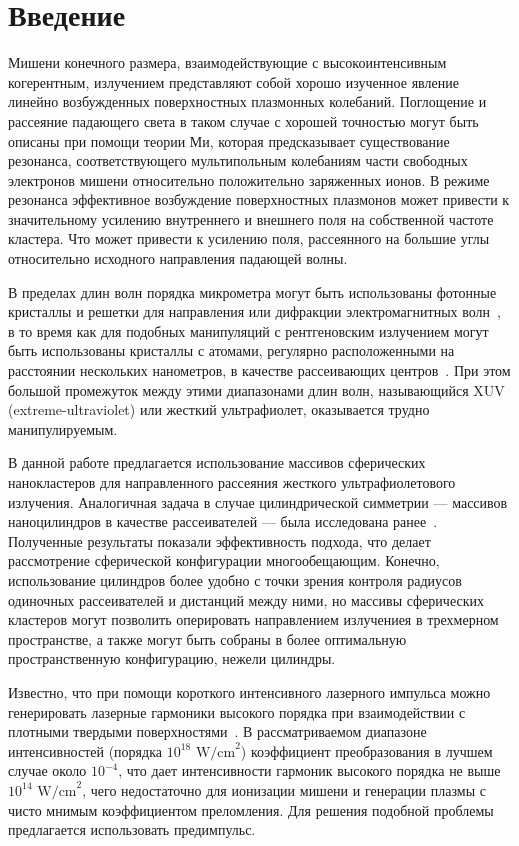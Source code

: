 \section{Введение}

Мишени конечного размера, взаимодействующие с высокоинтенсивным когерентным, излучением представляют собой хорошо изученное явление линейно возбужденных 
поверхностных плазмонных колебаний. Поглощение и рассеяние падающего света в таком случае с хорошей точностью могут быть описаны при помощи теории Ми, которая предсказывает существование резонанса, соответствующего мультипольным колебаниям части свободных электронов мишени относительно положительно заряженных ионов. В режиме резонанса эффективное возбуждение поверхностных плазмонов может привести к значительному усилению внутреннего и внешнего поля на собственной частоте кластера. Что может привести к усилению поля, рассеянного на большие углы относительно исходного направления падающей волны.

В пределах длин волн порядка микрометра могут быть использованы фотонные кристаллы и решетки для направления или дифракции электромагнитных волн~\cite{lin_zhang}, в то время как для подобных манипуляций с рентгеновским излучением могут быть использованы кристаллы с атомами, регулярно расположенными на расстоянии нескольких нанометров, в качестве рассеивающих центров~\cite{batterman_cole}. При этом большой промежуток между этими диапазонами длин волн, называющийся XUV (extreme-ultraviolet) или жесткий ультрафиолет, оказывается трудно манипулируемым.

В данной работе предлагается использование массивов сферических нанокластеров для направленного рассеяния жесткого ультрафиолетового излучения. Аналогичная задача в случае цилиндрической симметрии --- массивов наноцилиндров в качестве рассеивателей --- была исследована ранее~\cite{andreev_lecz}. Полученные результаты показали эффективность подхода, что делает рассмотрение сферической конфигурации многообещающим. Конечно, использование цилиндров более удобно с точки зрения контроля радиусов одиночных рассеивателей и дистанций между ними, но массивы сферических кластеров могут позволить оперировать направлением излучениея в трехмерном пространстве, а также могут быть собраны в более оптимальную пространственную конфигурацию, нежели цилиндры.

Известно, что при помощи короткого интенсивного лазерного импульса можно генерировать лазерные гармоники высокого порядка при взаимодействии с плотными твердыми поверхностями~\cite{teubner_gibbon_hoh}. В рассматриваемом диапазоне интенсивностей (порядка $10^{18}$ $\textrm{W/cm}^2$) коэффициент преобразования в лучшем случае около $10^{-4}$, что дает интенсивности гармоник высокого порядка не выше $10^{14}$ $\textrm{W/cm}^2$, чего недостаточно для ионизации мишени и генерации плазмы с чисто мнимым коэффициентом преломления. Для решения подобной проблемы предлагается использовать предимпульс.

